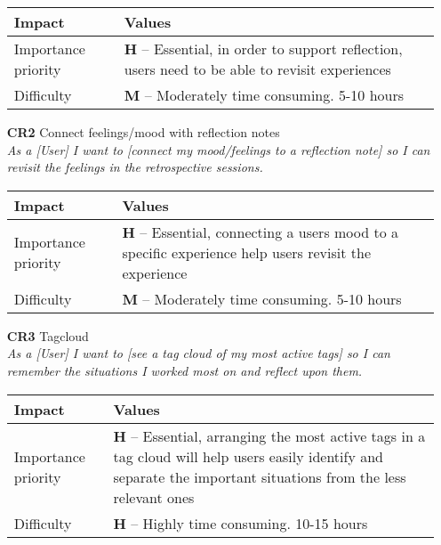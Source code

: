 \begin{itemize}
        \begin{tabular}{| l | p{8cm} |}
            \hline
            \rowcolor[gray]{0.8}
            \textbf{Impact} & \textbf{Values} \\
            \hline
            Importance priority & \textbf{H} -- Essential, in order to support reflection, users need to be able to revisit experiences\\
            Difficulty & \textbf{M} -- Moderately time consuming. 5-10 hours\\
            \hline
        \end{tabular}
    \vspace{0.5cm}

    \item[\textbf{CR2}] Connect feelings/mood with reflection notes\\
        \textit{\small{As a [User] I want to [connect my mood/feelings to a reflection note] so I can revisit the feelings in the retrospective sessions.}}

        \begin{tabular}{| l | p{8cm} |}
            \hline
            \rowcolor[gray]{0.8}
            \textbf{Impact} & \textbf{Values} \\
            \hline
            Importance priority & \textbf{H} -- Essential, connecting a users mood to a specific experience help users revisit the experience\\
            Difficulty & \textbf{M} -- Moderately time consuming. 5-10 hours\\
            \hline
        \end{tabular}
    \vspace{0.5cm}

    \item[\textbf{CR3}] Tagcloud\\
        \textit{\small{As a [User] I want to [see a tag cloud of my most active tags] so I can remember the situations I worked most on and reflect upon them.}}

        \begin{tabular}{| l | p{8cm} |}
            \hline
            \rowcolor[gray]{0.8}
            \textbf{Impact} & \textbf{Values} \\
            \hline
            Importance priority & \textbf{H} -- Essential, arranging the most active tags in a tag cloud will help users easily identify and separate the important situations from the less relevant ones\\
            Difficulty & \textbf{H} -- Highly time consuming. 10-15 hours\\
            \hline
        \end{tabular}
    \vspace{0.5cm}


\end{itemize}
